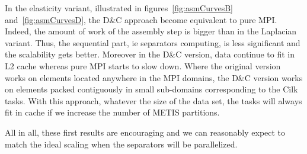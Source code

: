 \documentclass{IOS-Book-Article}
\begin{document}
In the elasticity variant, illustrated in figures~\ref{fig:asmCurvesB} and~\ref{fig:asmCurvesD}, the D\&C approach become equivalent to pure MPI.
Indeed, the amount of work of the assembly step is bigger than in the Laplacian variant.
Thus, the sequential part, ie separators computing, is less significant and the scalability gets better.
Moreover in the D\&C version, data continue to fit in L2 cache whereas pure MPI starts to slow down.
Where the original version works on elements located anywhere in the MPI domains, the D\&C version works on elements packed contiguously in small sub-domains corresponding
to the Cilk tasks.
With this approach, whatever the size of the data set, the tasks will always fit in cache if we increase the number of METIS partitions.

All in all, these first results are encouraging and we can reasonably expect to match the ideal scaling when the separators will be parallelized.
\end{document}
